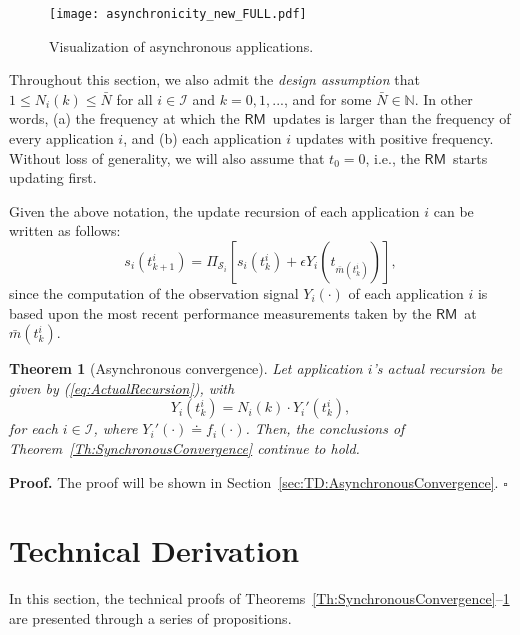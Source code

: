 \documentclass[letter,11pt]{article}
\newtheorem{theorem}{Theorem}[section]
\newenvironment{proof}{\textbf{Proof.}}{$\square$\\}
\begin{document}
\begin{figure}[t!]
  \centering
  
  \texttt{[image: asynchronicity\_new\_FULL.pdf]}
  \caption{Visualization of asynchronous applications.}
  \label{fig:Asynchronicity}
\end{figure}

Throughout this section, we also admit the \textit{design assumption} that $1\leq N_i(k)\leq\bar{N}$ for all $i\in\mathcal{I}$ and $k=0,1,...$, and for some $\bar{N}\in\mathbb{N}$. In other words, (a) the frequency at which the {$\mathsf{RM}$}\ updates is larger than the frequency of every application $i$, and (b) each application $i$ updates with positive frequency. Without loss of generality, we will also assume that $t_0=0$, i.e., the {$\mathsf{RM}$}\ starts updating first.

Given the above notation, the update recursion of each application $i$
can be written as follows:
\begin{equation} \label{eq:ActualRecursion} 
  s_i(t_{k+1}^i) 
  = \Pi_{\mathcal{S}_i}[s_i(t_{k}^i) + \epsilon Y_{i}(t_{\bar{m}(t_k^i)})],
\end{equation}
since the computation of the observation signal $Y_{i}(\cdot)$ of each application $i$ is based upon the most recent performance measurements taken by the {$\mathsf{RM}$}\ at $\bar{m}(t_k^i)$.

\begin{theorem}[Asynchronous convergence] \label{Th:AsynchronousConvergence} 
Let application $i$'s actual recursion be given by (\ref{eq:ActualRecursion}), with
  \begin{equation} \label{eq:AsynchronicityCondition} 
  Y_{i}(t^i_k) = N_i(k)\cdot Y_{i}'(t^i_k),
  \end{equation}
  for each $i\in\mathcal{I}$, where $Y_{i}'(\cdot) {\doteq} {f}_i(\cdot)$. Then, the conclusions of Theorem~\ref{Th:SynchronousConvergence} continue to hold.
\end{theorem}
\begin{proof}
  The proof will be shown in Section~\ref{sec:TD:AsynchronousConvergence}.
\end{proof}

\section{Technical Derivation} 
\label{sec:TechnicalDerivation}

In this section, the technical proofs of
Theorems~\ref{Th:SynchronousConvergence}--\ref{Th:AsynchronousConvergence}
are presented through a series of propositions.
\end{document}
